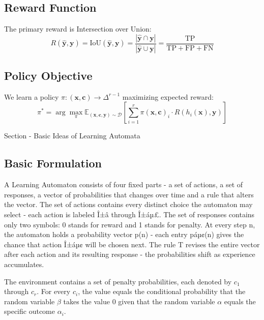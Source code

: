 \documentclass[11pt,a4paper]{article}
\begin{document}
\begin{itemize}
\subsection{Reward Function}

The primary reward is Intersection over Union:
\begin{equation}
R(\hat{\mathbf{y}}, \mathbf{y}) = \text{IoU}(\hat{\mathbf{y}}, \mathbf{y}) = \frac{|\hat{\mathbf{y}} \cap \mathbf{y}|}{|\hat{\mathbf{y}} \cup \mathbf{y}|} = \frac{\text{TP}}{\text{TP} + \text{FP} + \text{FN}}
\end{equation}

\subsection{Policy Objective}

We learn a policy $\pi : (\mathbf{x}, \mathbf{c}) \rightarrow \Delta^{r-1}$ maximizing expected reward:
\begin{equation}
\pi^* = \arg\max_\pi \mathbb{E}_{(\mathbf{x}, \mathbf{c}, \mathbf{y}) \sim \mathcal{D}} \left[ \sum_{i=1}^{r} \pi(\mathbf{x}, \mathbf{c})_i \cdot R(h_i(\mathbf{x}), \mathbf{y}) \right]
\end{equation}


Section - Basic Ideas of Learning Automata

\subsection{Basic Formulation}

A Learning Automaton consists of four fixed parts - a set of actions, a set of responses, a vector of probabilities that changes over time and a rule that alters the vector. The set of actions contains every distinct choice the automaton may select - each action is labeled Î±â through Î±áµ£. The set of responses contains only two symbols: 0 stands for reward and 1 stands for penalty. At every step n, the automaton holds a probability vector p(n) - each entry páµ¢(n) gives the chance that action Î±áµ¢ will be chosen next. The rule T revises the entire vector after each action and its resulting response - the probabilities shift as experience accumulates.

The environment contains a set of penalty probabilities, each denoted by \( c_1 \) through \( c_r \). For every \( c_i \), the value equals the conditional probability that the random variable \( \beta \) takes the value 0 given that the random variable \( \alpha \) equals the specific outcome \( \alpha_i \).


\end{itemize}
\end{document}
